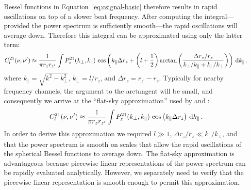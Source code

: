 \begin{bibunit}
\begin{subappendices}
Bessel functions in Equation~\ref{eq:csignal-basic} therefore results in rapid oscillations on top
of a slower beat frequency. After computing the integral---provided the power spectrum is
sufficiently smooth---the rapid oscillations will average down. Therefore this integral can be
approximated using only the latter term:
\begin{equation}\label{eq:csignal-beats}
    C^{21}_l(\nu, \nu^\prime) \approx
        \frac{1}{\pi r_z r_{z^\prime}}
        \int
        P_z^{21}(k_\perp, k_\parallel) \,
        \cos\left(
            k_\parallel \Delta r_z
            + \left(l+\frac{1}{2}\right) \arctan\left(
                \frac{\Delta r_z/r_z}{k_\perp/k_\parallel+k_\parallel/k_\perp}
            \right)
        \right)
        \, {\textrm d} k_\parallel\,,
\end{equation}
where $k_\parallel = \sqrt{k^2 - k_\perp^2}$, $k_\perp = l/r_z$, and $\Delta r_z = r_{z^\prime} -
r_z$. Typically for nearby frequency channels, the argument to the arctangent will be small, and
consequently we arrive at the ``flat-sky approximation'' used by \citet{2005MNRAS.356.1519B} and
\citet{2007MNRAS.378..119D}:
\begin{equation}
    C^{21}_l(\nu, \nu^\prime) \approx
        \frac{1}{\pi r_z r_{z^\prime}}
        \int
        P_z^{21}(k_\perp, k_\parallel) \,
        \cos\left(k_\parallel \Delta r_z\right)
        \, {\textrm d} k_\parallel\,.
\end{equation}
In order to derive this approximation we required $l\gg 1$, $\Delta r_z/r_z \ll
k_\parallel/k_\perp$, and that the power spectrum is smooth on scales that allow the rapid
oscillations of the spherical Bessel functions to average down.  The flat-sky approximation is
advantageous because piecewise linear representations of the power spectrum can be rapidly evaluated
analytically. However, we separately need to verify that the piecewise linear representation is
smooth enough to permit this approximation.

\end{subappendices}

\end{bibunit}

